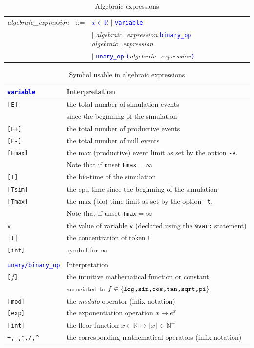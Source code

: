 \documentclass[11pt]{book}
\def\tcb#1{\textcolor{blue}{\ttt{#1}}}
\def\ttt#1{\texttt{#1}}
\def\var#1{\textquotesingle #1\textquotesingle}
\def\set#1{\{#1\}}
\def\Real{\mathbb R}
\def\Nat{\mathbb N}
\begin{document}
\begin{table}[htbp]
  \centering
  \caption{Algebraic expressions}
  \begin{tabular}{@{} lcl @{}}
    \textit{algebraic\_expression} & ::= & \tcb{$x\in\Real$} $\mid$ \tcb{variable} \\
     &  & $\mid$ \textit{algebraic\_expression} \tcb{binary\_op} \textit{algebraic\_expression}\\
     &  & $\mid$ \tcb{unary\_op} \tcb{(}\textit{algebraic\_expression}\tcb{)} \\ 
    \end{tabular}
  \label{tab:alg}
\end{table}



\begin{table}[htbp]
\centering
\caption{Symbol usable in algebraic expressions}
\begin{tabular}{@{} l|l @{} }
\toprule
\ttt{\tcb{variable}} & Interpretation \\
\midrule
\ttt{[E]} & the total number of simulation events\index{event}\\
& since the beginning of the simulation \\
\ttt{[E+]} & the total number of productive events\index{event} \\
\ttt{[E-]} & the total number of null events\index{null event}\\
\ttt{[Emax]} & the max (productive) event limit as set by the option \ttt{-e}. \\ &Note that if unset \ttt{Emax}$=\infty$\\
\ttt{[T]} & the bio-time of the simulation \\
\ttt{[Tsim]} & the cpu-time since the beginning of the simulation \\
\ttt{[Tmax]} & the max (bio)-time limit as set by the option \ttt{-t}. \\ &Note that if unset \ttt{Tmax}$=\infty$\\

\ttt{\var{v}} & the value of variable \ttt{\var{v}} (declared using the \ttt{\%var:} statement) \\
\ttt{|t|} & the concentration of token \ttt{t}\\
\ttt{[inf]} & symbol for $\infty$ \\\\
\toprule
\ttt{\tcb{unary/binary\_op}} & Interpretation \\
\midrule
\ttt{[}$f$\texttt{]} & the intuitive mathematical function or constant \\ &associated to $f\in\set{\hbox{\ttt{log,sin,cos,tan,sqrt,pi}}}$ \\
\ttt{[mod]} & the \emph{modulo} operator (infix notation)\\
\ttt{[exp]} & the exponentiation operation $x\mapsto e^x$ \\
\ttt{[int]} & the floor function $x\in\Real\mapsto \lfloor x\rfloor\in\Nat^+$ \\
\ttt{+,-,*,/,\^} & the corresponding mathematical operators (infix notation)\\
\bottomrule
\end{tabular}
\label{tab:operators}
\end{table}
\end{document}
